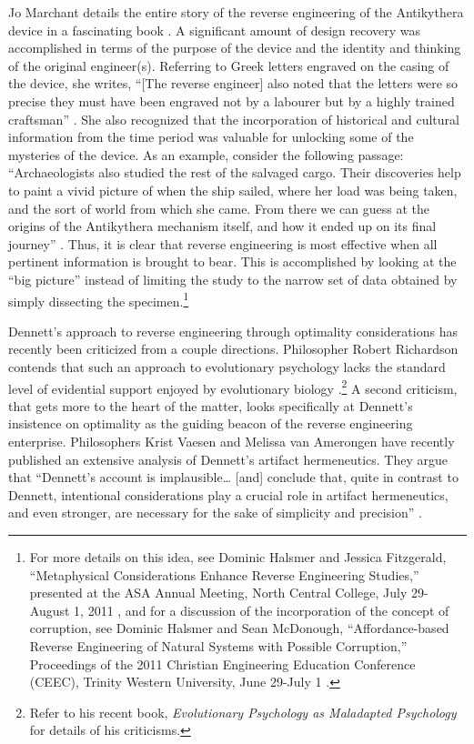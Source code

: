 Jo Marchant details the entire story of the reverse engineering of the
\mbox{Antikythera} device in a fascinating book \citep{marchant2009}. A
significant amount of design recovery was accomplished in terms of the
purpose of the device and the identity and thinking of the original
engineer(s). Referring to Greek letters engraved on the casing of the
device, she writes, “[The reverse engineer] also noted that the letters
were so precise they must have been engraved not by a labourer but by a
highly trained craftsman” \citep[][p.~55]{marchant2009}. She also recognized that
the incorporation of historical and cultural information from the time
period was valuable for unlocking some of the mysteries of the device.
As an example, consider the following passage: ``Archaeologists also
studied the rest of the salvaged cargo. Their discoveries help to paint
a vivid picture of when the ship sailed, where her load was being
taken, and the sort of world from which she came. From there we can
guess at the origins of the Antikythera mechanism itself, and how it
ended up on its final journey'' \citep[][p.~61]{marchant2009}. Thus, it is clear
that reverse engineering is most effective when all pertinent
information is brought to bear. This is accomplished by looking at the
“big picture” instead of limiting the study to the narrow set of data
obtained by simply dissecting the specimen.\footnote{%
For more details on this idea, see Dominic Halsmer
and Jessica Fitzgerald, ``Metaphysical Considerations Enhance Reverse
Engineering Studies,'' presented at the ASA Annual Meeting, North
Central College, July 29-August 1, 2011 \citep{halsmerfitzgerald2011}, and for a discussion of the
incorporation of the concept of corruption, see Dominic Halsmer and
Sean McDonough, ``Affordance-based Reverse Engineering of Natural
Systems with Possible Corruption,'' Proceedings of the 2011 Christian
Engineering Education Conference (CEEC), Trinity Western University,
June 29-July 1 \citep{halsmermcdonough2011}.
}

Dennett’s approach to reverse engineering through optimality
considerations has recently been criticized from a couple directions.
Philosopher Robert Richardson contends that such an approach to
evolutionary psychology lacks the standard level of evidential support
enjoyed by evolutionary biology \citep{richardson2007}.\footnote{Refer to his recent
book, \textit{Evolutionary Psychology as Maladapted Psychology} \citep{richardson2007} for details of his 
criticisms.} A second
criticism, that gets more to the heart of the matter, looks
specifically at Dennett’s insistence on optimality as the guiding
beacon of the reverse engineering enterprise. Philosophers Krist Vaesen
and Melissa van Amerongen have recently published an extensive analysis
of Dennett’s artifact hermeneutics. They argue that “Dennett’s account
is implausible{\ldots} [and] conclude that, quite in contrast to Dennett,
intentional considerations play a crucial role in artifact
hermeneutics, and even stronger, are necessary for the sake of
simplicity and precision” \citep[][p.~779]{vaesenamerongen2008}.

